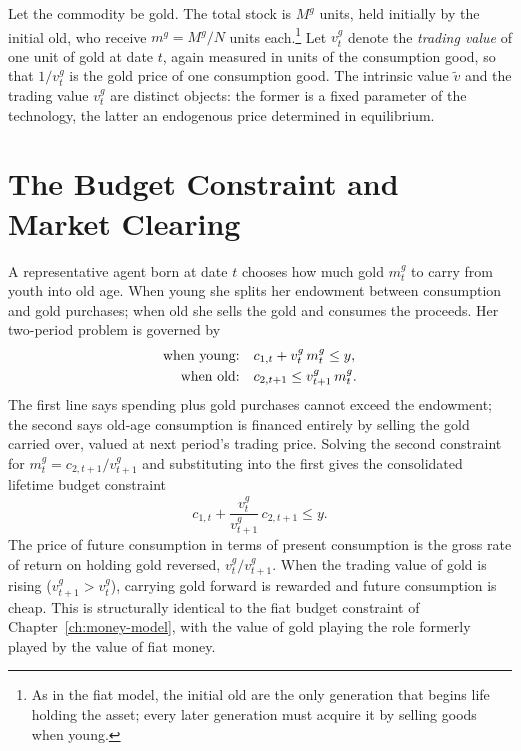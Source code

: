 Let the commodity be gold. The total stock is $M^g$ units, held initially by the initial old, who receive $m^g = M^g/N$ units each.\footnote{As in the fiat model, the initial old are the only generation that begins life holding the asset; every later generation must acquire it by selling goods when young.} Let $v^g_t$ denote the \emph{trading value} of one unit of gold at date $t$, again measured in units of the consumption good, so that $1/v^g_t$ is the gold price of one consumption good. The intrinsic value $\tilde v$ and the trading value $v^g_t$ are distinct objects: the former is a fixed parameter of the technology, the latter an endogenous price determined in equilibrium.

\section{The Budget Constraint and Market Clearing}

A representative agent born at date $t$ chooses how much gold $m^g_t$ to carry from youth into old age. When young she splits her endowment between consumption and gold purchases; when old she sells the gold and consumes the proceeds. Her two-period problem is governed by
\[
\begin{aligned}
\text{when young:}\quad & c_{1,t} + v^g_t\, m^g_t \le y,\\
\text{when old:}\quad & c_{2,t+1} \le v^g_{t+1}\, m^g_t.
\end{aligned}
\]
The first line says spending plus gold purchases cannot exceed the endowment; the second says old-age consumption is financed entirely by selling the gold carried over, valued at next period's trading price. Solving the second constraint for $m^g_t = c_{2,t+1}/v^g_{t+1}$ and substituting into the first gives the consolidated lifetime budget constraint
\begin{equation}
c_{1,t} + \frac{v^g_t}{v^g_{t+1}}\, c_{2,t+1} \le y.
\label{eq:commodity-budget}
\end{equation}
The price of future consumption in terms of present consumption is the gross rate of return on holding gold reversed, $v^g_t/v^g_{t+1}$. When the trading value of gold is rising ($v^g_{t+1} > v^g_t$), carrying gold forward is rewarded and future consumption is cheap. This is structurally identical to the fiat budget constraint of Chapter~\ref{ch:money-model}, with the value of gold playing the role formerly played by the value of fiat money.


